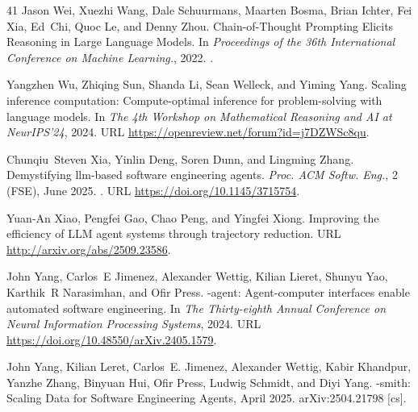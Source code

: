 \documentclass{article}
\begin{document}
\begin{thebibliography}{41}
Jason Wei, Xuezhi Wang, Dale Schuurmans, Maarten Bosma, Brian Ichter, Fei Xia, Ed~Chi, Quoc Le, and Denny Zhou.
\newblock Chain-of-{Thought} {Prompting} {Elicits} {Reasoning} in {Large} {Language} {Models}.
\newblock In \emph{Proceedings of the 36th International Conference on Machine Learning.}, 2022.
\newblock {}.

Yangzhen Wu, Zhiqing Sun, Shanda Li, Sean Welleck, and Yiming Yang.
\newblock Scaling inference computation: Compute-optimal inference for problem-solving with language models.
\newblock In \emph{The 4th Workshop on Mathematical Reasoning and AI at NeurIPS'24}, 2024.
\newblock URL \url{https://openreview.net/forum?id=j7DZWSc8qu}.

Chunqiu~Steven Xia, Yinlin Deng, Soren Dunn, and Lingming Zhang.
\newblock Demystifying llm-based software engineering agents.
\newblock \emph{Proc. ACM Softw. Eng.}, 2 (FSE), June 2025.
\newblock {}.
\newblock URL \url{https://doi.org/10.1145/3715754}.

Yuan-An Xiao, Pengfei Gao, Chao Peng, and Yingfei Xiong.
\newblock Improving the efficiency of {LLM} agent systems through trajectory reduction.
\newblock URL \url{http://arxiv.org/abs/2509.23586}.

John Yang, Carlos~E Jimenez, Alexander Wettig, Kilian Lieret, Shunyu Yao, Karthik~R Narasimhan, and Ofir Press.
-agent: Agent-computer interfaces enable automated software engineering.
\newblock In \emph{The Thirty-eighth Annual Conference on Neural Information Processing Systems}, 2024.
\newblock URL \url{https://doi.org/10.48550/arXiv.2405.1579}.

John Yang, Kilian Leret, Carlos~E. Jimenez, Alexander Wettig, Kabir Khandpur, Yanzhe Zhang, Binyuan Hui, Ofir Press, Ludwig Schmidt, and Diyi Yang.
-smith: {Scaling} {Data} for {Software} {Engineering} {Agents}, April 2025.
\newblock arXiv:2504.21798 [cs].


\end{thebibliography}
\end{document}
